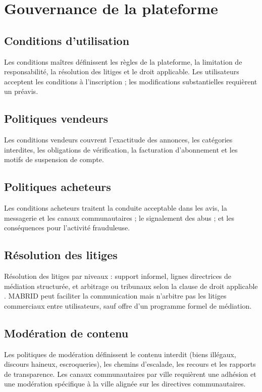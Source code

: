 \section{Gouvernance de la plateforme}

\subsection{Conditions d'utilisation}

Les conditions maîtres définissent les règles de la plateforme, la limitation de responsabilité, la résolution des litiges et le droit applicable. Les utilisateurs acceptent les conditions à l'inscription ; les modifications substantielles requièrent un préavis.

\subsection{Politiques vendeurs}

Les conditions vendeurs couvrent l'exactitude des annonces, les catégories interdites, les obligations de vérification, la facturation d'abonnement et les motifs de suspension de compte.

\subsection{Politiques acheteurs}

Les conditions acheteurs traitent la conduite acceptable dans les avis, la messagerie et les canaux communautaires ; le signalement des abus ; et les conséquences pour l'activité frauduleuse.

\subsection{Résolution des litiges}

Résolution des litiges par niveaux : support informel, lignes directrices de médiation structurée, et arbitrage ou tribunaux selon la clause de droit applicable \parencite{moroccoCivilProcedure}. MABRID peut faciliter la communication mais n'arbitre pas les litiges commerciaux entre utilisateurs, sauf offre d'un programme formel de médiation.

\subsection{Modération de contenu}

Les politiques de modération définissent le contenu interdit (biens illégaux, discours haineux, escroqueries), les chemins d'escalade, les recours et les rapports de transparence. Les canaux communautaires par ville requièrent une adhésion et une modération spécifique à la ville alignée sur les directives communautaires.

